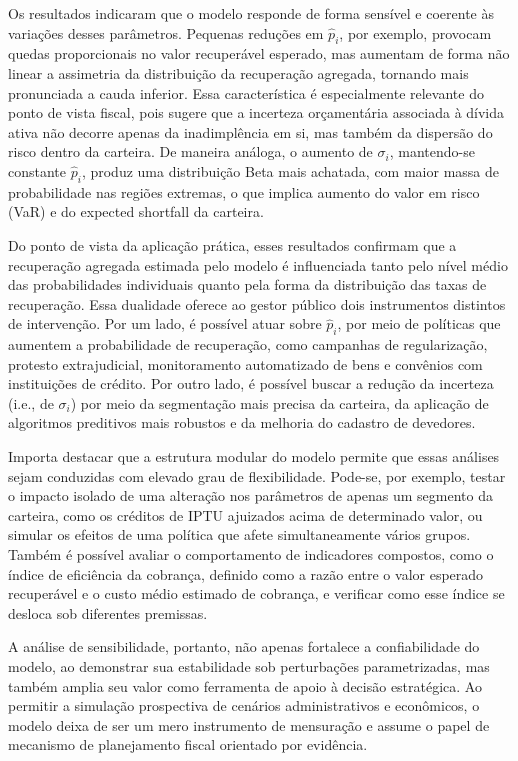 \documentclass[a4paper,12pt]{article}
\begin{document}
Os resultados indicaram que o modelo responde de forma sensível e coerente às variações desses parâmetros. Pequenas reduções em $\hat{p}_{i}$, por exemplo, provocam quedas proporcionais no valor recuperável esperado, mas aumentam de forma não linear a assimetria da distribuição da recuperação agregada, tornando mais pronunciada a cauda inferior. Essa característica é especialmente relevante do ponto de vista fiscal, pois sugere que a incerteza orçamentária associada à dívida ativa não decorre apenas da inadimplência em si, mas também da dispersão do risco dentro da carteira. De maneira análoga, o aumento de 
$\sigma_{i}$, mantendo-se constante $\hat{p}_{i}$, produz uma distribuição Beta mais achatada, com maior massa de probabilidade nas regiões extremas, o que implica aumento do valor em risco (VaR) e do expected shortfall da carteira.

Do ponto de vista da aplicação prática, esses resultados confirmam que a recuperação agregada estimada pelo modelo é influenciada tanto pelo nível médio das probabilidades individuais quanto pela forma da distribuição das taxas de recuperação. Essa dualidade oferece ao gestor público dois instrumentos distintos de intervenção. Por um lado, é possível atuar sobre 
$\hat{p}_{i}$, por meio de políticas que aumentem a probabilidade de recuperação, como campanhas de regularização, protesto extrajudicial, monitoramento automatizado de bens e convênios com instituições de crédito. Por outro lado, é possível buscar a redução da incerteza (i.e., de 
$\sigma_{i}$) por meio da segmentação mais precisa da carteira, da aplicação de algoritmos preditivos mais robustos e da melhoria do cadastro de devedores.

Importa destacar que a estrutura modular do modelo permite que essas análises sejam conduzidas com elevado grau de flexibilidade. Pode-se, por exemplo, testar o impacto isolado de uma alteração nos parâmetros de apenas um segmento da carteira, como os créditos de IPTU ajuizados acima de determinado valor, ou simular os efeitos de uma política que afete simultaneamente vários grupos. Também é possível avaliar o comportamento de indicadores compostos, como o índice de eficiência da cobrança, definido como a razão entre o valor esperado recuperável e o custo médio estimado de cobrança, e verificar como esse índice se desloca sob diferentes premissas.

A análise de sensibilidade, portanto, não apenas fortalece a confiabilidade do modelo, ao demonstrar sua estabilidade sob perturbações parametrizadas, mas também amplia seu valor como ferramenta de apoio à decisão estratégica. Ao permitir a simulação prospectiva de cenários administrativos e econômicos, o modelo deixa de ser um mero instrumento de mensuração e assume o papel de mecanismo de planejamento fiscal orientado por evidência.
\end{document}
